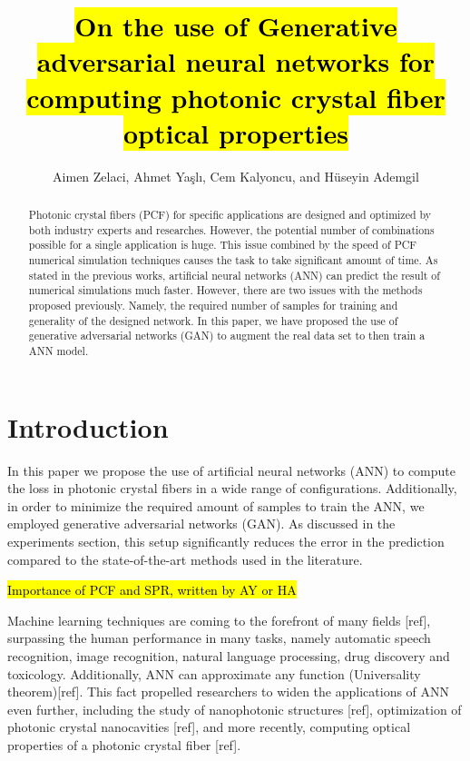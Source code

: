 \documentclass[draft, a4, 10pt, onecolumn]{IEEEtran}
\begin{document}
\title{\hl{On the use of Generative adversarial neural networks for computing photonic crystal fiber optical properties}}

\author{Aimen Zelaci, Ahmet Yaşlı, Cem Kalyoncu, and Hüseyin Ademgil}

\maketitle
	
\begin{abstract}
Photonic crystal fibers (PCF) for specific applications are designed and optimized by both industry experts and researches. However, the potential number of combinations possible for a single application is huge. This issue combined by the speed of PCF numerical simulation techniques causes the task to take significant amount of time. As stated in the previous works, artificial neural networks (ANN) can predict the result of numerical simulations much faster. However, there are two issues with the methods proposed previously. Namely, the required number of samples for training and generality of the designed network. In this paper, we have proposed the use of generative adversarial networks (GAN) to augment the real data set to then train a  ANN model.

\end{abstract}

\section{Introduction}

In this paper we propose the use of artificial neural networks (ANN) to compute the loss in photonic crystal fibers in a wide range of configurations. Additionally, in order to minimize the required amount of samples to train the ANN, we employed generative adversarial networks (GAN). As discussed in the experiments section, this setup significantly reduces the error in the prediction compared to the state-of-the-art methods used in the literature.

\hl{Importance of PCF and SPR, written by AY or HA}

Machine learning techniques are coming to the forefront of many fields [ref], surpassing the human performance in many tasks, namely automatic speech recognition, image recognition, natural language processing, drug discovery and toxicology. Additionally, ANN can approximate any function (Universality theorem)[ref]. This fact propelled researchers to widen the applications of ANN even further, including the study of nanophotonic structures [ref], optimization of photonic crystal nanocavities [ref], and more recently, computing optical properties of a photonic crystal fiber [ref].
\end{document}
